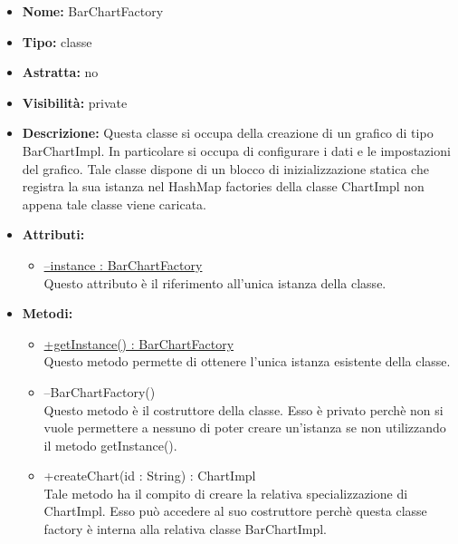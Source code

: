 			
			\begin{itemize}
			\item \textbf{Nome:} BarChartFactory
			\item \textbf{Tipo:} classe
			
		\item \textbf{Astratta:}
		no
			\item \textbf{Visibilità:} private
			\item \textbf{Descrizione:} Questa classe si occupa della creazione di un grafico di tipo BarChartImpl. In particolare si occupa di configurare i dati e le impostazioni del grafico. Tale classe dispone di un blocco di inizializzazione statica che registra la sua istanza nel HashMap factories della classe ChartImpl non appena tale classe viene caricata.
			\item \textbf{Attributi:}
				\begin{itemize}
				\setlength{\itemsep}{5pt}
				
					\item[\ding{111}] \underline{--instance : BarChartFactory} \\ [1mm] Questo attributo è il riferimento all'unica istanza della classe.
				\end{itemize}
		
			\item \textbf{Metodi:}
				\begin{itemize}
				\setlength{\itemsep}{5pt}
				
					\item[\ding{111}] {\underline{+getInstance() : BarChartFactory}} \\ [1mm] Questo metodo permette di ottenere l'unica istanza esistente della classe.
					\item[\ding{111}] {{--BarChartFactory()}} \\ [1mm] Questo metodo è il costruttore della classe. Esso è privato perchè non si vuole permettere a nessuno di poter creare un’istanza se non utilizzando il metodo getInstance().

					\item[\ding{111}] {{+createChart(id : String) : ChartImpl}} \\ [1mm] Tale metodo ha il compito di creare la relativa specializzazione di ChartImpl. Esso può accedere al suo costruttore perchè questa classe factory è interna alla relativa classe BarChartImpl.
				\end{itemize}
		
			\end{itemize}

